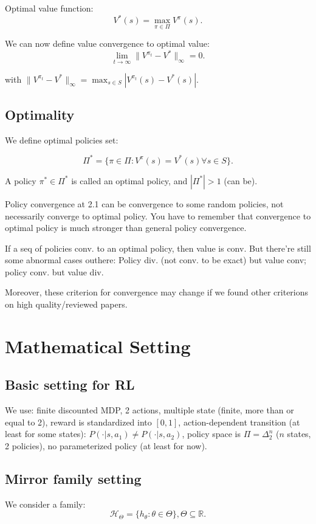 \documentclass[11pt,a4paper]{article}
\begin{document}
Optimal value function:
\[
V^*(s) = \max_{\pi\in \Pi}V^{\pi}(s).
\]

We can now define value convergence to optimal value:
\[
\lim_{t\rightarrow \infty}\|V^{\pi_t} - V^*\|_{\infty} = 0.
\]

with $\|V^{\pi_t} - V^*\|_{\infty} = \max_{s\in S}|V^{\pi_t}(s) - V^*(s)|$.

\subsection{Optimality}

We define optimal policies set:

\[
\Pi^* = \{\pi \in \Pi: V^\pi(s) = V^*(s) \forall s \in S\}.
\]

A policy $\pi^*\in \Pi^*$ is called an optimal policy, and $|\Pi^*|>1$ (can be).

\begin{note}
Policy convergence at 2.1 can be convergence to some random policies, not necessarily converge to optimal policy. You have to remember that convergence to optimal policy is much stronger than general policy convergence.
\end{note}

\begin{note}
If a seq of policies conv. to an optimal policy, then value is conv. But there're still some abnormal cases outhere: Policy div. (not conv. to be exact) but value conv; policy conv. but value div.

Moreover, these criterion for convergence may change if we found other criterions on high quality/reviewed papers.
\end{note}

\newpage

\section{Mathematical Setting}
\subsection{Basic setting for RL}
We use: finite discounted MDP, 2 actions, multiple state (finite, more than or equal to 2), reward is standardized into $[0,1]$, action-dependent transition (at least for some states): $P(\cdot|s, a_1)\neq P(\cdot|s,a_2)$, policy space is $\Pi = \Delta^n_2$ ($n$ states, 2 policies), no parameterized policy (at least for now).

\subsection{Mirror family setting}
We consider a family:
\[
\mathcal{H}_{\Theta} = \{h_{\theta}:\theta \in \Theta\}, \Theta \subseteq \mathbb{R}.
\]
\end{document}
